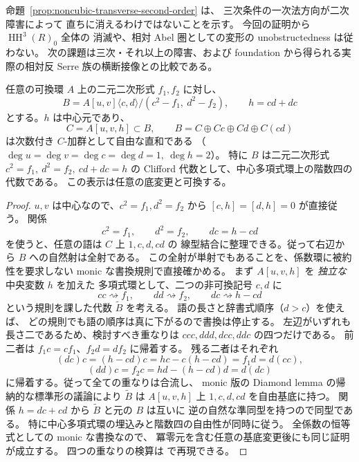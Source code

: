 \begin{remark}[二次持上げと実際のモジュライとの距離]
命題~\ref{prop:noncubic-transverse-second-order} は、
三次条件の一次法方向が二次障害によって
直ちに消えるわけではないことを示す。
今回の証明から $\operatorname{HH}^3(R)_0$ 全体の
消滅や、相対 Abel 圏としての変形の unobstructedness
は従わない。
次の課題は三次・それ以上の障害、および
foundation から得られる実際の相対反 Serre
族の横断接像との比較である。
\end{remark}

\begin{lemma}
\label{lem:noncubic-relative-clifford-center}
任意の可換環 $A$ 上の二元二次形式 $f_1,f_2$ に対し、
\[
 B=A[u,v]\langle c,d\rangle/(c^2-f_1,\ d^2-f_2),
 \qquad h=cd+dc
\]
とする。$h$ は中心元であり、
\[
 C=A[u,v,h]\subset B,\qquad
 B=C\oplus Cc\oplus Cd\oplus C(cd)
 \tag{NC-Cl}\label{eq:noncubic-relative-clifford}
\]
は次数付き $C$-加群として自由な直和である
（$\deg u=\deg v=\deg c=\deg d=1,\ \deg h=2$）。
特に $B$ は二元二次形式
$c^2=f_1,\ d^2=f_2,\ cd+dc=h$
の Clifford 代数として、中心多項式環上の階数四の代数である。
この表示は任意の底変更と可換する。
\end{lemma}
\begin{proof}
$u,v$ は中心なので、$c^2=f_1,d^2=f_2$ から
$[c,h]=[d,h]=0$ が直接従う。
関係
\[
 c^2=f_1,\qquad d^2=f_2,\qquad dc=h-cd
\]
を使うと、任意の語は $C$ 上 $1,c,d,cd$ の
線型結合に整理できる。従って右辺から $B$ への自然射は全射である。
この全射が単射でもあることを、係数環に被約性を要求しない
monic な書換規則で直接確かめる。
まず $A[u,v,h]$ を \emph{独立な} 中央変数 $h$ を加えた
多項式環として、二つの非可換記号 $c,d$ に
\[
 cc\rightsquigarrow f_1,\qquad
 dd\rightsquigarrow f_2,\qquad
 dc\rightsquigarrow h-cd
\]
という規則を課した代数 $\widetilde B$ を考える。
語の長さと辞書式順序（$d>c$）を使えば、
どの規則でも語の順序は真に下がるので書換は停止する。
左辺がいずれも長さ二であるため、検討すべき重なりは
$ccc,ddd,dcc,ddc$ の四つだけである。
前二者は $f_1c=cf_1$、$f_2d=df_2$ に帰着する。
残る二者はそれぞれ
\[
 (dc)c=(h-cd)c
   =hc-c(h-cd)=f_1d=d(cc),
\]
\[
 (dd)c=f_2c
   =hd-(h-cd)d=d(dc)
\]
に帰着する。従って全ての重なりは合流し、
monic 版の Diamond lemma の帰納的な標準形の議論により
$\widetilde B$ は $A[u,v,h]$ 上
$1,c,d,cd$ を自由基底に持つ。
関係 $h=dc+cd$ から $\widetilde B$ と元の $B$ は互いに
逆の自然な準同型を持つので同型である。
特に中心多項式環の埋込みと階数四の自由性が同時に従う。
全係数の恒等式としての monic な書換なので、
冪零元を含む任意の基底変更後にも同じ証明が成立する。
四つの重なりの検算は
 で再現できる。
\end{proof}

